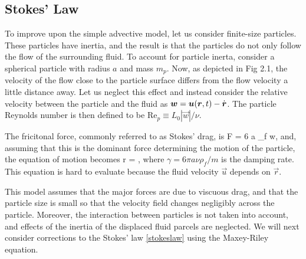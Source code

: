 \subsection{Stokes' Law}


To improve upon the simple advective model, let us consider finite-size particles. These particles have inertia, and the result is that the particles do not only follow the flow of the surrounding fluid. To account for particle inerta, consider a spherical particle with radius $a$ and mass $m_p$. Now, as depicted in Fig 2.1, the velocity of the flow close to the particle surface differs from the flow velocity a little distance away. Let us neglect this effect and instead consider the relative velocity between the particle and the fluid as $\boldsymbol{w} = \boldsymbol{u}(\boldsymbol{r}, t) - \dot{\boldsymbol{r}}$. The particle Reynolds number is then defined to be Re$_p \equiv L_0 |\vec w| / \nu $. 

The fricitonal force, commonly referred to as Stokes' drag, is
\beq
\vec F = 6 \pi a \nu \rho_f \vec w,
\eeq
and, assuming that this is the dominant force determining the motion of the particle, the equation of motion becomes 
\beq
\ddvec r = ,
\eeq
where $\gamma = 6 \pi a \nu \rho_f/m$ is the damping rate. 
This equation is hard to evaluate because the fluid velocity $\vec u$ depends on $\vec r$. 

This model assumes that the major forces are due to viscuous drag, and that the particle size is small so that the velocity field changes negligibly across the particle. Moreover, the interaction between particles is not taken into account, and effects of the inertia of the displaced fluid parcels are neglected. We will next consider corrections to the Stokes' law \eqref{stokeslaw} using the Maxey-Riley equation.



